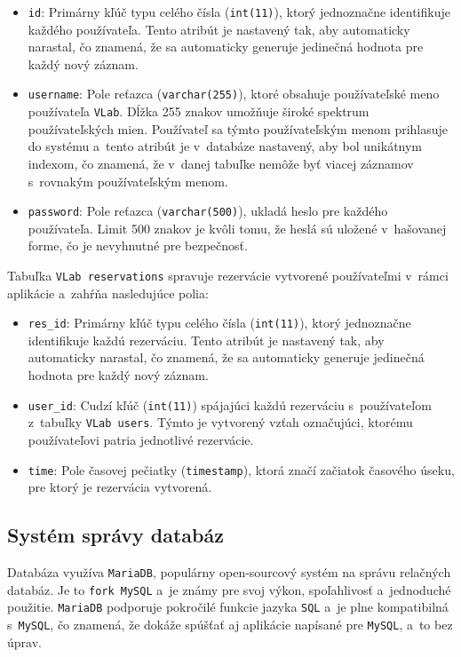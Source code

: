 \begin{itemize}
    \item \verb|id|: Primárny kľúč typu celého čísla (\verb|int(11)|), ktorý jednoznačne identifikuje každého používateľa. Tento atribút je nastavený tak, aby automaticky narastal, čo znamená, že sa automaticky generuje jedinečná hodnota pre každý nový záznam.
    \item \verb|username|: Pole reťazca (\verb|varchar(255)|), ktoré obsahuje používateľské meno používateľa \verb|VLab|. Dĺžka 255 znakov umožňuje široké spektrum používateľských mien. Používateľ sa týmto používateľským menom prihlasuje do systému a~tento atribút je v~databáze nastavený, aby bol unikátnym indexom, čo znamená, že v~danej tabuľke nemôže byť viacej záznamov s~rovnakým používateľským menom.
    \item \verb|password|: Pole reťazca (\verb|varchar(500)|), ukladá heslo pre každého používateľa. Limit 500 znakov je kvôli tomu, že heslá sú uložené v~hašovanej forme, čo je nevyhnutné pre bezpečnosť.
\end{itemize}

Tabuľka \verb|VLab reservations| spravuje rezervácie vytvorené používateľmi v~rámci aplikácie a~zahŕňa nasledujúce polia: 

\begin{itemize}
    \item \verb|res_id|: Primárny kľúč typu celého čísla (\verb|int(11)|), ktorý jednoznačne identifikuje každú rezerváciu. Tento atribút je nastavený tak, aby automaticky narastal, čo znamená, že sa automaticky generuje jedinečná hodnota pre každý nový záznam.
    \item \verb|user_id|: Cudzí kľúč (\verb|int(11)|) spájajúci každú rezerváciu s~používateľom z~tabuľky \verb|VLab users|. Týmto je vytvorený vzťah označujúci, ktorému používateľovi patria jednotlivé rezervácie.
    \item \verb|time|: Pole časovej pečiatky (\verb|timestamp|), ktorá značí začiatok časového úseku, pre ktorý je rezervácia vytvorená.
\end{itemize}

\subsection{Systém správy databáz}

Databáza využíva \verb|MariaDB|, populárny open-sourcový systém na správu relačných databáz. Je to \verb|fork MySQL| a~je známy pre svoj výkon, spoľahlivosť a~jednoduché použitie. \verb|MariaDB| podporuje pokročilé funkcie jazyka \verb|SQL| a~je plne kompatibilná s~\verb|MySQL|, čo znamená, že dokáže spúšťať aj aplikácie napísané pre \verb|MySQL|, a~to bez úprav.


